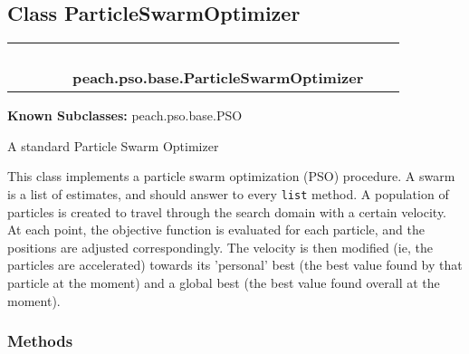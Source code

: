 
\subsection{Class ParticleSwarmOptimizer}

    \label{peach:pso:base:ParticleSwarmOptimizer}
\begin{tabular}{cccccccc}
\multicolumn{2}{r}{\settowidth{\BCL}{object}\multirow{2}{\BCL}{object}}
&&
&&
  \\\cline{3-3}
  &&\multicolumn{1}{c|}{}
&&
&&
  \\
\multicolumn{4}{r}{\settowidth{\BCL}{list}\multirow{2}{\BCL}{list}}
&&
  \\\cline{5-5}
  &&&&\multicolumn{1}{c|}{}
&&
  \\
&&&&\multicolumn{2}{l}{\textbf{peach.pso.base.ParticleSwarmOptimizer}}
\end{tabular}

\textbf{Known Subclasses:} peach.pso.base.PSO


A standard Particle Swarm Optimizer

This class implements a particle swarm optimization (PSO) procedure. A
swarm is a list of estimates, and should answer to every \texttt{list} method. A
population of particles is created to travel through the search domain with
a certain velocity. At each point, the objective function is evaluated for
each particle, and the positions are adjusted correspondingly. The velocity
is then modified (ie, the particles are accelerated) towards its 'personal'
best (the best value found by that particle at the moment) and a global best
(the best value found overall at the moment).


  \subsubsection{Methods}

